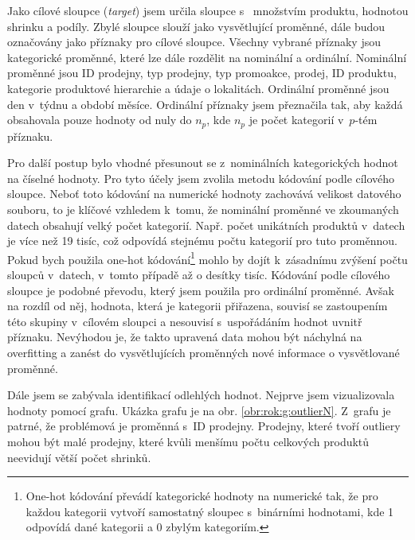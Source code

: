 Jako cílové sloupce (\emph{target}) jsem určila sloupce s~ množstvím produktu, hodnotou shrinku a podíly. Zbylé sloupce slouží jako vysvětlující proměnné, dále budou označovány jako příznaky pro cílové sloupce. Všechny vybrané příznaky jsou kategorické proměnné, které lze dále rozdělit na nominální a ordinální. Nominální proměnné jsou ID prodejny, typ prodejny, typ promoakce, prodej, ID produktu, kategorie produktové hierarchie a údaje o lokalitách. Ordinální proměnné jsou den v~týdnu a období měsíce. Ordinální příznaky jsem přeznačila tak, aby každá obsahovala pouze hodnoty od nuly do $n_p$, kde $n_p$ je počet kategorií v~$p$-tém příznaku. 

Pro další postup bylo vhodné přesunout se z~nominálních kategorických hodnot na číselné hodnoty. Pro tyto účely jsem zvolila metodu kódování podle cílového sloupce.  %
Neboť toto kódování na numerické hodnoty zachovává velikost datového souboru, to je klíčové vzhledem k~tomu, že nominální proměnné ve zkoumaných datech obsahují velký počet kategorií. 
Např. počet unikátních produktů v~datech je více než 19 tisíc, což odpovídá stejnému počtu kategorií pro tuto proměnnou. Pokud bych použila one-hot kódování\footnote{One-hot kódování převádí kategorické hodnoty na numerické tak, že pro každou kategorii vytvoří samostatný sloupec s~binárními hodnotami, kde 1 odpovídá dané kategorii a 0 zbylým kategoriím.}  mohlo by dojít k~zásadnímu zvýšení počtu sloupců v~datech, v~tomto případě až o desítky tisíc. Kódování podle cílového sloupce je podobné převodu, který jsem použila pro ordinální proměnné. Avšak na rozdíl od něj, hodnota, která je kategorii přiřazena, souvisí se zastoupením této skupiny v~cílovém sloupci a nesouvisí s~uspořádáním hodnot uvnitř příznaku. Nevýhodou je, že takto upravená data mohou být náchylná na overfitting a zanést do vysvětlujících proměnných nové informace o vysvětlované proměnné. 


Dále jsem se zabývala identifikací odlehlých hodnot. Nejprve jsem vizualizovala hodnoty pomocí grafu. Ukázka grafu je na obr. \ref*{obr:rok:g:outlierN}. Z~grafu je patrné, že problémová je proměnná s~ID prodejny. Prodejny, které tvoří outliery mohou být malé prodejny, které kvůli menšímu počtu celkových produktů neevidují větší počet shrinků. %

